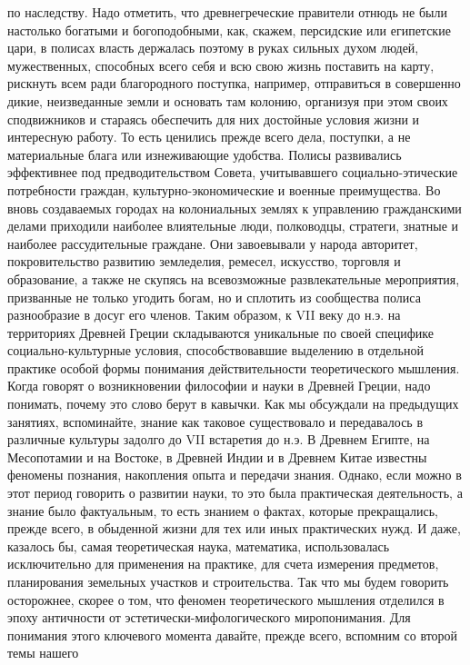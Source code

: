 по наследству. Надо отметить, что древнегреческие правители отнюдь не были
настолько богатыми и богоподобными, как, скажем, персидские или египетские цари,
в полисах власть держалась поэтому в руках сильных духом людей, мужественных,
способных всего себя и всю свою жизнь поставить на карту, рискнуть всем ради
благородного поступка, например, отправиться в совершенно дикие, неизведанные
земли и основать там колонию, организуя при этом своих сподвижников и стараясь
обеспечить для них достойные условия жизни и интересную работу. То есть ценились
прежде всего дела, поступки, а не материальные блага или изнеживающие удобства.
Полисы развивались эффективнее под предводительством Совета, учитывавшего
социально-этические потребности граждан, культурно-экономические и военные
преимущества. Во вновь создаваемых городах на колониальных землях к управлению
гражданскими делами приходили наиболее влиятельные люди, полководцы, стратеги,
знатные и наиболее рассудительные граждане. Они завоевывали у народа авторитет,
покровительство развитию земледелия, ремесел, искусство, торговля и образование,
а также не скупясь на всевозможные развлекательные мероприятия, призванные не
только угодить богам, но и сплотить из сообщества полиса разнообразие в досуг
его членов. Таким образом, к VII веку до н.э. на территориях Древней Греции
складываются уникальные по своей специфике социально-культурные условия,
способствовавшие выделению в отдельной практике особой формы понимания
действительности теоретического мышления. Когда говорят о возникновении
философии и науки в Древней Греции, надо понимать, почему это слово берут в
кавычки. Как мы обсуждали на предыдущих занятиях, вспоминайте, знание как
таковое существовало и передавалось в различные культуры задолго до VII
встаретия до н.э. В Древнем Египте, на Месопотамии и на Востоке, в Древней Индии
и в Древнем Китае известны феномены познания, накопления опыта и передачи
знания. Однако, если можно в этот период говорить о развитии науки, то это была
практическая деятельность, а знание было фактуальным, то есть знанием о фактах,
которые прекращались, прежде всего, в обыденной жизни для тех или иных
практических нужд. И даже, казалось бы, самая теоретическая наука, математика,
использовалась исключительно для применения на практике, для счета измерения
предметов, планирования земельных участков и строительства. Так что мы будем
говорить осторожнее, скорее о том, что феномен теоретического мышления отделился
в эпоху античности от эстетически-мифологического миропонимания. Для понимания
этого ключевого момента давайте, прежде всего, вспомним со второй темы нашего
